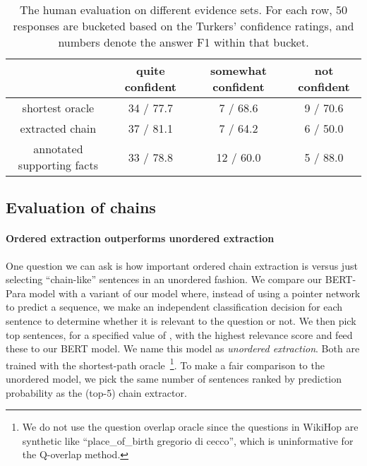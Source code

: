 \documentclass[11pt,a4paper]{article}
\begin{document}
\begin{table*}[t]
\small
\centering
\renewcommand{\tabcolsep}{1.3mm}
\begin{tabular}{ c  c   c   c   }
\toprule
            & quite confident  & somewhat confident & not confident    \\
\midrule
shortest oracle  &  34 / 77.7 & 7 / 68.6  & 9 / 70.6  \\
extracted chain  & 37 / 81.1 & 7 / 64.2 & 6 / 50.0 \\
annotated supporting facts  & 33 / 78.8 & 12 / 60.0  & 5 / 88.0 \\
\bottomrule
\end{tabular}
\caption{The human evaluation on different evidence sets. For each row, 50 responses are bucketed based on the Turkers' confidence ratings, and numbers denote the answer F1 within that bucket.}
\vspace{-0.5cm}
\label{tab:human_eval}
\end{table*}








\subsection{Evaluation of chains}

\paragraph{Ordered extraction outperforms unordered extraction} One question we can ask is how important ordered chain extraction is versus just selecting ``chain-like'' sentences in an unordered fashion. We compare our BERT-Para model with a variant of our model where, instead of using a pointer network to predict a sequence, we make an independent classification decision for each sentence to determine whether it is relevant to the question or not. We then pick top  sentences, for a specified value of , with the highest relevance score and feed these to our BERT model. We name this model as \emph{unordered extraction}. Both are trained with the shortest-path oracle~\footnote{We do not use the question overlap oracle since the questions in WikiHop are synthetic like ``place\_of\_birth gregorio di cecco'', which is uninformative for the Q-overlap method.}. To make a fair comparison to the unordered model, we pick the same number of sentences ranked by prediction probability as the (top-5) chain extractor. 
\end{document}
